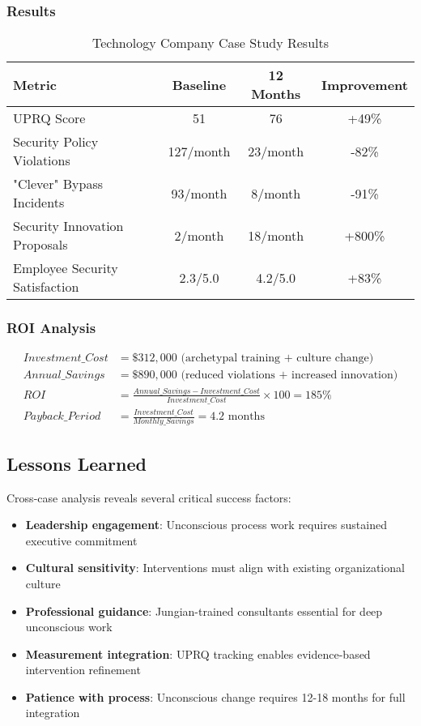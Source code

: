 \documentclass[11pt,a4paper]{article}
\begin{document}
\subsubsection{Results}

\begin{table}[H]
\centering
\caption{Technology Company Case Study Results}
\begin{tabular}{lccc}
\toprule
Metric & Baseline & 12 Months & Improvement \\
\midrule
UPRQ Score & 51 & 76 & +49\% \\
Security Policy Violations & 127/month & 23/month & -82\% \\
"Clever" Bypass Incidents & 93/month & 8/month & -91\% \\
Security Innovation Proposals & 2/month & 18/month & +800\% \\
Employee Security Satisfaction & 2.3/5.0 & 4.2/5.0 & +83\% \\
\bottomrule
\end{tabular}
\end{table}

\subsubsection{ROI Analysis}

\begin{align}
Investment\_Cost &= \$312,000 \text{ (archetypal training + culture change)} \\
Annual\_Savings &= \$890,000 \text{ (reduced violations + increased innovation)} \\
ROI &= \frac{Annual\_Savings - Investment\_Cost}{Investment\_Cost} \times 100 = 185\% \\
Payback\_Period &= \frac{Investment\_Cost}{Monthly\_Savings} = 4.2 \text{ months}
\end{align}

\subsection{Lessons Learned}

Cross-case analysis reveals several critical success factors:

\begin{itemize}
\item \textbf{Leadership engagement}: Unconscious process work requires sustained executive commitment
\item \textbf{Cultural sensitivity}: Interventions must align with existing organizational culture
\item \textbf{Professional guidance}: Jungian-trained consultants essential for deep unconscious work
\item \textbf{Measurement integration}: UPRQ tracking enables evidence-based intervention refinement
\item \textbf{Patience with process}: Unconscious change requires 12-18 months for full integration
\end{itemize}
\end{document}

